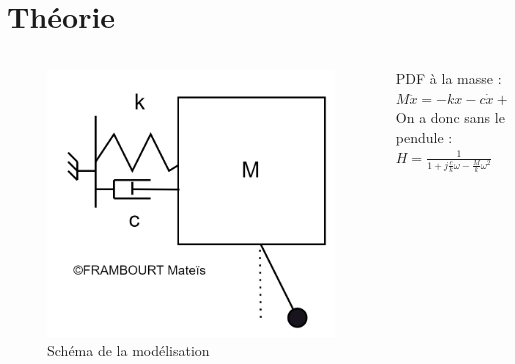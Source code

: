 \documentclass{beamer}
\begin{document}
	\section{Théorie}
	\begin{frame}
		\begin{columns}
			\begin{column}{0.5\textwidth}
				\begin{figure}
					\includegraphics[width=\textwidth]{Image/Schéma modélisation.png}
					\caption{Schéma de la modélisation}
				\end{figure}
			\end{column}
			\begin{column}{0.5\textwidth}
				PDF à la masse : 
				$M\ddot{x} = -kx -c\dot{x} + f(t)$\\
				On a donc sans le pendule : $H=\frac{1}{1+j\frac{c}{k}\omega-\frac{M}{k}\omega^2}$ 
				
			\end{column}
		\end{columns}
	\end{frame}
\end{document}
